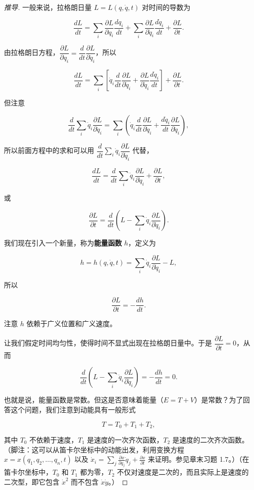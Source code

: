 \begin{proof}[推导]
一般来说，拉格朗日量 $L = L(q, \dot{q}, t)$ 对时间的导数为

\[
\frac{dL}{dt} = \sum_i\frac{\partial L}{\partial q_i}\frac{dq_i}{dt} + \sum_i\frac{\partial L}{\partial \dot{q}_i}\frac{d\dot{q}_i}{dt} + \frac{\partial L}{\partial t}.
\]

由拉格朗日方程，$\dfrac{\partial L}{\partial q_i} = \dfrac{d}{dt}\dfrac{\partial L}{\partial \dot{q}_i}$，所以

\[
\frac{dL}{dt} = \sum_i\left[\dot{q}_i\frac{d}{dt}\frac{\partial L}{\partial \dot{q}_i} + \frac{\partial L}{\partial \dot{q}_i}\frac{d\dot{q}_i}{dt}\right] + \frac{\partial L}{\partial t}.
\]

但注意

\[
\frac{d}{dt}\sum_i\dot{q}_i\frac{\partial L}{\partial \dot{q}_i} = \sum_i\left(\dot{q}_i\frac{d}{dt}\frac{\partial L}{\partial \dot{q}_i} + \frac{d\dot{q}_i}{dt}\frac{\partial L}{\partial \dot{q}_i}\right),
\]

所以前面方程中的求和可以用 $\dfrac{d}{dt}\sum_i\dot{q}_i\dfrac{\partial L}{\partial \dot{q}_i}$ 代替，

\[
\frac{dL}{dt} = \frac{d}{dt}\sum_i\dot{q}_i\frac{\partial L}{\partial \dot{q}_i} + \frac{\partial L}{\partial t},
\]

或

\[
\frac{\partial L}{\partial t} = \frac{d}{dt}\left(L - \sum_i\dot{q}_i\frac{\partial L}{\partial \dot{q}_i}\right).
\]

我们现在引入一个新量，称为\textbf{能量函数} $h$，定义为

\[
h = h(q, \dot{q}, t) = \sum_i\dot{q}_i\frac{\partial L}{\partial \dot{q}_i} - L,
\]

所以

\[
\frac{\partial L}{\partial t} = -\frac{dh}{dt}.
\]

注意 $h$ 依赖于广义位置和广义速度。

让我们假定时间均匀性，使得时间不显式出现在拉格朗日量中。于是 $\dfrac{\partial L}{\partial t} = 0$，从而

\[
\frac{d}{dt}\left(L - \sum_i\dot{q}_i\frac{\partial L}{\partial \dot{q}_i}\right) = -\frac{dh}{dt} = 0.
\]

也就是说，能量函数是常数。但这是否意味着能量（$E = T + V$）是常数？为了回答这个问题，我们注意到动能具有一般形式

\[
T = T_0 + T_1 + T_2,
\]

其中 $T_0$ 不依赖于速度，$T_1$ 是速度的一次齐次函数，$T_2$ 是速度的二次齐次函数。（脚注：这可以从笛卡尔坐标中的动能出发，利用变换方程 $x = x(q_1, q_2, \ldots, q_n, t)$ 以及 $\dot{x}_i = \sum_j\frac{\partial x}{\partial q_j}\dot{q}_j + \frac{\partial x}{\partial t}$ 来证明。参见章末习题 1.7。）（在笛卡尔坐标中，$T_0$ 和 $T_1$ 都为零，$T_2$ 不仅对速度是二次的，而且实际上是速度的二次型，即它包含 $\dot{x}^2$ 而不包含 $\dot{x}\dot{y}$。）


\end{proof}
